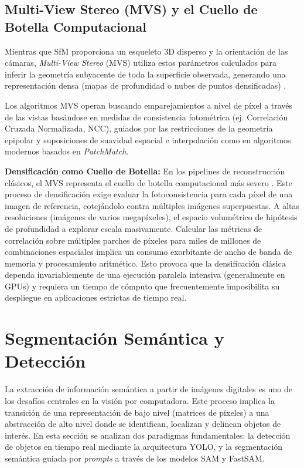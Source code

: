 \subsection{Multi-View Stereo (MVS) y el Cuello de Botella Computacional}

Mientras que SfM proporciona un esqueleto 3D disperso y la orientación de las cámaras, \textit{Multi-View Stereo} (MVS) utiliza estos parámetros calculados para inferir la geometría subyacente de toda la superficie observada, generando una representación densa (mapas de profundidad o nubes de puntos densificadas) \cite{seitz2006comparison}. 

Los algoritmos MVS operan buscando emparejamientos a nivel de píxel a través de las vistas basándose en medidas de consistencia fotométrica (ej. Correlación Cruzada Normalizada, NCC), guiados por las restricciones de la geometría epipolar y suposiciones de suavidad espacial e interpolación como en algoritmos modernos basados en \textit{PatchMatch}.

\textbf{Densificación como Cuello de Botella:} En los pipelines de reconstrucción clásicos, el MVS representa el cuello de botella computacional más severo \cite{schoenberger2016mvs}. Este proceso de densificación exige evaluar la fotoconsistencia para cada píxel de una imagen de referencia, cotejándolo contra múltiples imágenes superpuestas. A altas resoluciones (imágenes de varios megapíxeles), el espacio volumétrico de hipótesis de profundidad a explorar escala masivamente. Calcular las métricas de correlación sobre múltiples parches de píxeles para miles de millones de combinaciones espaciales implica un consumo exorbitante de ancho de banda de memoria y procesamiento aritmético. Esto provoca que la densificación clásica dependa invariablemente de una ejecución paralela intensiva (generalmente en GPUs) y requiera un tiempo de cómputo que frecuentemente imposibilita su despliegue en aplicaciones estrictas de tiempo real.

\section{Segmentación Semántica y Detección}

La extracción de información semántica a partir de imágenes digitales es uno de los desafíos centrales en la visión por computadora. Este proceso implica la transición de una representación de bajo nivel (matrices de píxeles) a una abstracción de alto nivel donde se identifican, localizan y delinean objetos de interés. En esta sección se analizan dos paradigmas fundamentales: la detección de objetos en tiempo real mediante la arquitectura YOLO, y la segmentación semántica guiada por \textit{prompts} a través de los modelos SAM y FastSAM.

